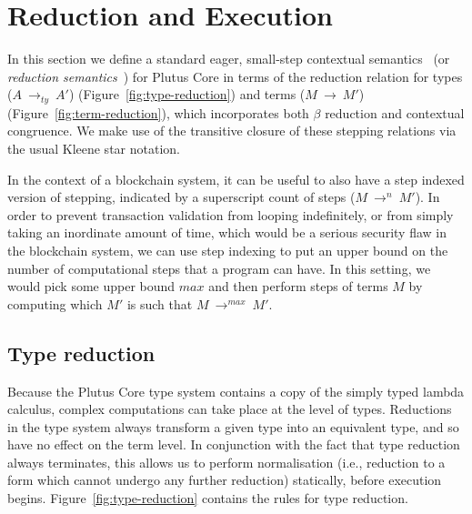 \documentclass[a4paper]{article}
\newcommand{\typeStep}[2]{#1 ~ \rightarrow_{ty} ~ #2}
\newcommand{\step}[2]{#1 ~ \rightarrow ~ #2}
\newcommand{\multistepIndexed}[3]{#1 ~ \rightarrow^{#2} ~ #3}
\begin{document}



\section{Reduction and Execution}
\label{sec:reduction}

In this section we define a standard eager,
small-step contextual semantics~\cite[5.3]{Harper:PFPL} (or
\textit{reduction semantics}~\cite[\S2]{Felleisen-Hieb}) for Plutus
Core in terms of the reduction relation for types
(\(\typeStep{A}{A'}\)) (Figure~\ref{fig:type-reduction}) 
and terms (\(\step{M}{M'}\)) (Figure~\ref{fig:term-reduction}), which
incorporates both $\beta$ reduction and contextual congruence. We make
use of the transitive closure of these stepping relations via the
usual Kleene star notation.

In the context of a blockchain system, it can be useful to also have a
step indexed version of stepping, indicated by a superscript count of
steps (\(\multistepIndexed{M}{n}{M'}\)). In order to prevent
transaction validation from looping indefinitely, or from simply
taking an inordinate amount of time, which would be a serious security
flaw in the blockchain system, we can use step indexing to put an
upper bound on the number of computational steps that a program can
have. In this setting, we would pick some upper bound $\mathit{max}$
and then perform steps of terms $M$ by computing which $M'$ is such
that \(\multistepIndexed{M}{\mathit{max}}{M'}\).


\newpage 

\subsection{Type reduction}
Because the Plutus Core type system contains a copy of the simply
typed lambda calculus, complex computations can take place at the
level of types.  Reductions in the type system always transform a
given type into an equivalent type, and so have no effect on the term
level.  In conjunction with the fact that type reduction always
terminates, this allows us to perform normalisation (i.e., reduction to
a form which cannot undergo any further reduction) statically, before
execution begins.  Figure~\ref{fig:type-reduction} contains the rules
for type reduction.
\end{document}

